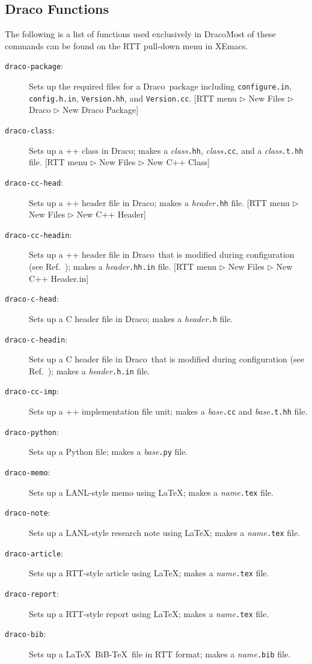 \documentclass[11pt]{nmemo}
\newcommand{\comp}[1]{{\normalfont\texttt{\footnotesize{#1}}}}
\newcommand{\draco}{{\normalfont\sffamily Draco}}
\newcommand{\xemacs}{{\normalfont\sffamily XEmacs}}
\begin{document}
\subsection{Draco Functions}
\label{sec:dfunc}

The following is a list of functions used exclusively in \draco\.
Most of these commands can be found on the RTT pull-down menu in
\xemacs.
\begin{description}
\item[\comp{draco-package}:] Sets up the required files for a \draco\ 
  package including \comp{configure.in}, \comp{config.h.in},
  \comp{Version.hh}, and \comp{Version.cc}. [RTT menu $\triangleright$
  New Files $\triangleright$ Draco $\triangleright$ New Draco Package]
\item[\comp{draco-class}:] Sets up a \C++ class in \draco; makes a
  \textsl{class}\comp{.hh}, \textsl{class}\comp{.cc}, and a
  \textsl{class}\comp{.t.hh} file. [RTT menu $\triangleright$
  New Files $\triangleright$ New C++ Class]
\item[\comp{draco-cc-head}:] Sets up a \C++ header file in \draco;
  makes a \textsl{header}\comp{.hh} file. [RTT menu $\triangleright$
  New Files $\triangleright$ New C++ Header]
\item[\comp{draco-cc-headin}:] Sets up a \C++ header file in \draco\ 
  that is modified during configuration (see Ref.~\cite{draco-build});
  makes a \textsl{header}\comp{.hh.in} file. [RTT menu $\triangleright$
  New Files $\triangleright$ New C++ Header.in]
\item[\comp{draco-c-head}:] Sets up a C header file in \draco; makes a 
  \textsl{header}\comp{.h} file.
\item[\comp{draco-c-headin}:] Sets up a C header file in \draco\ that
  is modified during configuration (see Ref.~\cite{draco-build});
  makes a \textsl{header}\comp{.h.in} file.
\item[\comp{draco-cc-imp}:] Sets up a \C++ implementation file unit;
  makes a \textsl{base}\comp{.cc} and \textsl{base}\comp{.t.hh} file.
\item[\comp{draco-python}:] Sets up a Python file; makes a
  \textsl{base}\comp{.py} file.
\item[\comp{draco-memo}:] Sets up a LANL-style memo using \LaTeX;
  makes a \textsl{name}\comp{.tex} file.
\item[\comp{draco-note}:] Sets up a LANL-style research note using
  \LaTeX; makes a \textsl{name}\comp{.tex} file.
\item[\comp{draco-article}:] Sets up a RTT-style article using \LaTeX;
  makes a \textsl{name}\comp{.tex} file.
\item[\comp{draco-report}:] Sets up a RTT-style report using \LaTeX;
  makes a \textsl{name}\comp{.tex} file.
\item[\comp{draco-bib}:] Sets up a \LaTeX\ BiB-\TeX\ file in RTT
  format; makes a \textsl{name}\comp{.bib} file.
\end{description}
\end{document}
